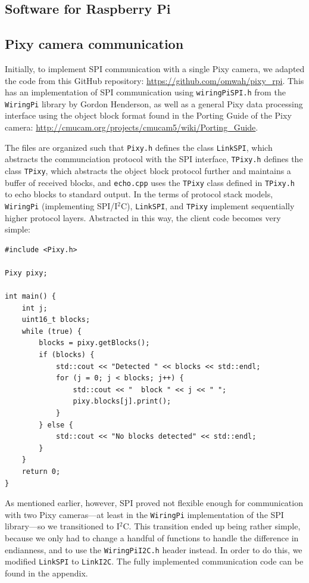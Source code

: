 \documentclass[letterpaper, 11pt]{article}
\newcommand{\iic}{I$^2$C\xspace}
\begin{document}
\begin{enumerate}[label=\textbf{\arabic*.}]
\section{Software for Raspberry Pi}
\subsection{Pixy camera communication}
Initially, to implement SPI communication with a single Pixy camera, we adapted the code from this GitHub repository: \url{https://github.com/omwah/pixy_rpi}. This has an implementation of SPI communication using \verb|wiringPiSPI.h| from the \verb|WiringPi| library by Gordon Henderson, as well as a general Pixy data processing interface using the object block format found in the Porting Guide of the Pixy camera: \url{http://cmucam.org/projects/cmucam5/wiki/Porting_Guide}.

The files are organized such that \verb|Pixy.h| defines the class \verb|LinkSPI|, which abstracts the communciation protocol with the SPI interface, \verb|TPixy.h| defines the class \verb|TPixy|, which abstracts the object block protocol further and maintains a buffer of received blocks, and \verb|echo.cpp| uses the \texttt{TPixy} class defined in \texttt{TPixy.h} to echo blocks to standard output. In the terms of protocol stack models, \verb|WiringPi| (implementing SPI/\iic), \verb|LinkSPI|, and \verb|TPixy| implement sequentially higher protocol layers. Abstracted in this way, the client code becomes very simple:

\begin{verbatim}
#include <Pixy.h>

Pixy pixy;

int main() {
    int j;
    uint16_t blocks;
    while (true) {
        blocks = pixy.getBlocks();
        if (blocks) {
            std::cout << "Detected " << blocks << std::endl;
            for (j = 0; j < blocks; j++) {
                std::cout << "  block " << j << " ";
                pixy.blocks[j].print();
            }
        } else {
            std::cout << "No blocks detected" << std::endl;
        }
    }
    return 0;
}
\end{verbatim}

As mentioned earlier, however, SPI proved not flexible enough for communication with two Pixy cameras---at least in the \texttt{WiringPi} implementation of the SPI library---so we transitioned to \iic. This transition ended up being rather simple, because we only had to change a handful of functions to handle the difference in endianness, and to use the \verb|WiringPiI2C.h| header instead. In order to do this, we modified \verb|LinkSPI| to \verb|LinkI2C|. The fully implemented communication code can be found in the appendix.


\end{enumerate}
\end{document}
